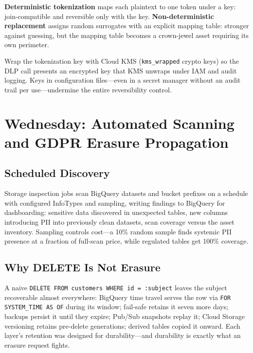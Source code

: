 \begin{definitionbox}
\textbf{Deterministic tokenization} maps each plaintext to one token under a key: join-compatible and reversible only with the key. \textbf{Non-deterministic replacement} assigns random surrogates with an explicit mapping table: stronger against guessing, but the mapping table becomes a crown-jewel asset requiring its own perimeter.
\end{definitionbox}

\begin{tipbox}
Wrap the tokenization key with Cloud KMS (\texttt{kms\_wrapped} crypto keys) so the DLP call presents an encrypted key that KMS unwraps under IAM and audit logging. Keys in configuration files---even in a secret manager without an audit trail per use---undermine the entire reversibility control.
\end{tipbox}

\section{Wednesday: Automated Scanning and GDPR Erasure Propagation}

\subsection{Scheduled Discovery}
Storage inspection jobs scan BigQuery datasets and bucket prefixes on a schedule with configured InfoTypes and sampling, writing findings to BigQuery for dashboarding: sensitive data discovered in unexpected tables, new columns introducing PII into previously clean datasets, scan coverage versus the asset inventory. Sampling controls cost---a 10\% random sample finds systemic PII presence at a fraction of full-scan price, while regulated tables get 100\% coverage.

\subsection{Why DELETE Is Not Erasure}
A naive \texttt{DELETE FROM customers WHERE id = :subject} leaves the subject recoverable almost everywhere: BigQuery time travel serves the row via \texttt{FOR SYSTEM\_TIME AS OF} during its window; fail-safe retains it seven more days; backups persist it until they expire; Pub/Sub snapshots replay it; Cloud Storage versioning retains pre-delete generations; derived tables copied it onward. Each layer's retention was designed for durability---and durability is exactly what an erasure request fights.

